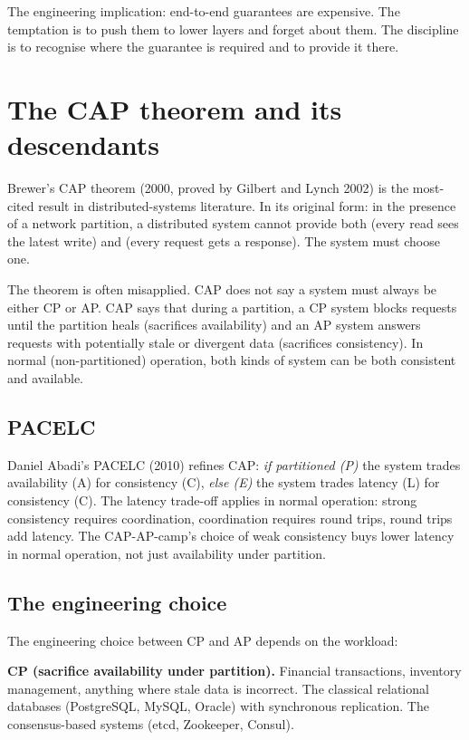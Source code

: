 The engineering implication: end-to-end guarantees are expensive. The temptation is to push them to lower layers and forget about them. The discipline is to recognise where the guarantee is required and to provide it there.

\section{The CAP theorem and its descendants}

Brewer's CAP theorem (2000, proved by Gilbert and Lynch 2002) is the most-cited result in distributed-systems literature. In its original form: in the presence of a network partition, a distributed system cannot provide both  (every read sees the latest write) and  (every request gets a response). The system must choose one.

The theorem is often misapplied. CAP does not say a system must always be either CP or AP. CAP says that during a partition, a CP system blocks requests until the partition heals (sacrifices availability) and an AP system answers requests with potentially stale or divergent data (sacrifices consistency). In normal (non-partitioned) operation, both kinds of system can be both consistent and available.

\subsection{PACELC}

Daniel Abadi's PACELC (2010) refines CAP: \emph{if partitioned (P)} the system trades availability (A) for consistency (C), \emph{else (E)} the system trades latency (L) for consistency (C). The latency trade-off applies in normal operation: strong consistency requires coordination, coordination requires round trips, round trips add latency. The CAP-AP-camp's choice of weak consistency buys lower latency in normal operation, not just availability under partition.

\subsection{The engineering choice}

The engineering choice between CP and AP depends on the workload:

\textbf{CP (sacrifice availability under partition).} Financial transactions, inventory management, anything where stale data is incorrect. The classical relational databases (PostgreSQL, MySQL, Oracle) with synchronous replication. The consensus-based systems (etcd, Zookeeper, Consul).

